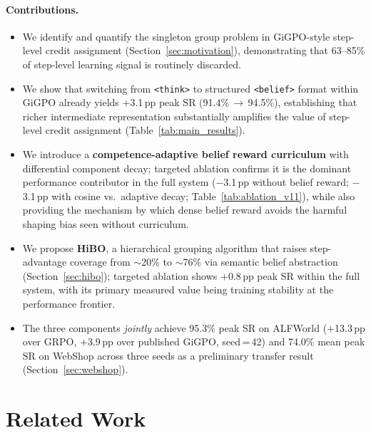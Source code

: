 \documentclass{article}
\begin{document}
\paragraph{Contributions.}
\begin{itemize}[leftmargin=1.5em,itemsep=2pt]
  \item We identify and quantify the singleton group problem in GiGPO-style
    step-level credit assignment (Section~\ref{sec:motivation}), demonstrating
    that 63--85\% of step-level learning signal is routinely discarded.
  \item We show that switching from \texttt{<think>} to structured
    \texttt{<belief>} format within GiGPO already yields $+$3.1\,pp peak SR
    (91.4\%\,$\to$\,94.5\%), establishing that richer intermediate representation
    substantially amplifies the value of step-level credit assignment
    (Table~\ref{tab:main_results}).
  \item We introduce a \textbf{competence-adaptive belief reward curriculum}
    with differential component decay; targeted ablation confirms it is the
    dominant performance contributor in the full system ($-$3.1\,pp without
    belief reward; $-$3.1\,pp with cosine vs.\ adaptive decay;
    Table~\ref{tab:ablation_v11}), while also providing the mechanism by which
    dense belief reward avoids the harmful shaping bias seen without curriculum.
  \item We propose \textbf{HiBO}, a hierarchical grouping algorithm that
    raises step-advantage coverage from $\sim$20\% to $\sim$76\% via semantic
    belief abstraction (Section~\ref{sec:hibo}); targeted ablation shows $+$0.8\,pp
    peak SR within the full system, with its primary measured value being
    training stability at the performance frontier.
  \item The three components \emph{jointly} achieve 95.3\% peak SR on ALFWorld
    ($+$13.3\,pp over GRPO, $+$3.9\,pp over published GiGPO, seed\,=\,42)
    and 74.0\% mean peak SR on WebShop across three seeds as a preliminary
    transfer result (Section~\ref{sec:webshop}).
\end{itemize}


\section{Related Work}
\label{sec:related}
\end{document}
